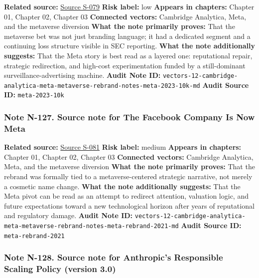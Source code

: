 \documentclass[
  american,
  11pt,
  letterpaper,
]{article}
\begin{document}
\textbf{Related source:}
\hyperref[source-s-079-meta-platforms-inc-2023-annual-report-form-10-k]{Source
S-079} \textbf{Risk label:} low \textbf{Appears in chapters:} Chapter
01, Chapter 02, Chapter 03 \textbf{Connected vectors:} Cambridge
Analytica, Meta, and the metaverse diversion \textbf{What the note
primarily proves:} That the metaverse bet was not just branding
language; it had a dedicated segment and a continuing loss structure
visible in SEC reporting. \textbf{What the note additionally suggests:}
That the Meta story is best read as a layered one: reputational repair,
strategic redirection, and high-cost experimentation funded by a
still-dominant surveillance-advertising machine. \textbf{Audit Note ID:}
\texttt{vectors-12-cambridge-analytica-meta-metaverse-rebrand-notes-meta-2023-10k-md}
\textbf{Audit Source ID:} \texttt{meta-2023-10k}

\subsubsection{Note N-127. Source note for The Facebook Company Is Now
Meta}\label{note-n-127-vectors-12-cambridge-analytica-meta-metaverse-rebrand-notes-meta-rebrand-2021-md}

\textbf{Related source:}
\hyperref[source-s-081-the-facebook-company-is-now-meta]{Source S-081}
\textbf{Risk label:} medium \textbf{Appears in chapters:} Chapter 01,
Chapter 02, Chapter 03 \textbf{Connected vectors:} Cambridge Analytica,
Meta, and the metaverse diversion \textbf{What the note primarily
proves:} That the rebrand was formally tied to a metaverse-centered
strategic narrative, not merely a cosmetic name change. \textbf{What the
note additionally suggests:} That the Meta pivot can be read as an
attempt to redirect attention, valuation logic, and future expectations
toward a new technological horizon after years of reputational and
regulatory damage. \textbf{Audit Note ID:}
\texttt{vectors-12-cambridge-analytica-meta-metaverse-rebrand-notes-meta-rebrand-2021-md}
\textbf{Audit Source ID:} \texttt{meta-rebrand-2021}

\subsubsection{Note N-128. Source note for Anthropic's Responsible
Scaling Policy (version
3.0)}\label{note-n-128-vectors-13-openai-governance-qstar-talent-exodus-notes-anthropic-rsp-v3-2026-md}
\end{document}
